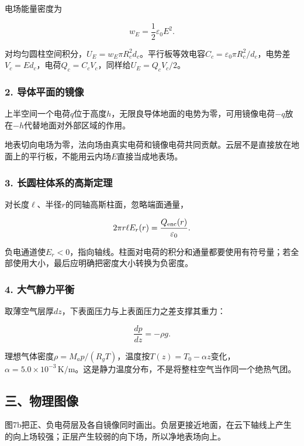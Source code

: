 \documentclass[12pt,a4paper,fontset=fandol]{ctexart}
\begin{document}
电场能量密度为

\[
w_E=\frac12\varepsilon_0E^2.
\]

对均匀圆柱空间积分，\(U_E=w_E\pi R_c^2d_c\)。平行板等效电容\(C_c=\varepsilon_0\pi R_c^2/d_c\)，电势差\(V_c=Ed_c\)，电荷\(Q_c=C_cV_c\)，同样给\(U_E=Q_cV_c/2\)。

\subsubsection{2.
导体平面的镜像}\label{ux5bfcux4f53ux5e73ux9762ux7684ux955cux50cf}

上半空间一个电荷\(q\)位于高度\(h\)，无限良导体地面的电势为零，可用镜像电荷\(-q\)放在\(-h\)代替地面对外部区域的作用。

地表切向电场为零，法向场由真实电荷和镜像电荷共同贡献。云层不是直接放在地面上的平行板，不能用云内场\(E\)直接当成地表场。

\subsubsection{3.
长圆柱体系的高斯定理}\label{ux957fux5706ux67f1ux4f53ux7cfbux7684ux9ad8ux65afux5b9aux7406}

对长度\(\ell\)、半径\(r\)的同轴高斯柱面，忽略端面通量，

\[
2\pi r\ell E_r(r)=\frac{Q_{\rm enc}(r)}{\varepsilon_0}.
\]

负电通道使\(E_r<0\)，指向轴线。柱面对电荷的积分和通量都要使用有符号量；若全部使用大小，最后应明确把密度大小转换为负密度。

\subsubsection{4.
大气静力平衡}\label{ux5927ux6c14ux9759ux529bux5e73ux8861}

取薄空气层厚\(dz\)，下表面压力与上表面压力之差支撑其重力：

\[
\frac{dp}{dz}=-\rho g.
\]

理想气体密度\(\rho=M_ap/(R_gT)\)，温度按\(T(z)=T_0-\alpha z\)变化，\(\alpha=5.0\times10^{-3}\,\mathrm{K/m}\)。这是静力温度分布，不是将整柱空气当作同一个绝热气团。

\subsection{三、物理图像}\label{ux4e09ux7269ux7406ux56feux50cf-6}

图7b把正、负电荷层及各自镜像同时画出。负层更接近地面，在云下轴线上产生的向上场较强；正层产生较弱的向下场，所以净地表场向上。
\end{document}
